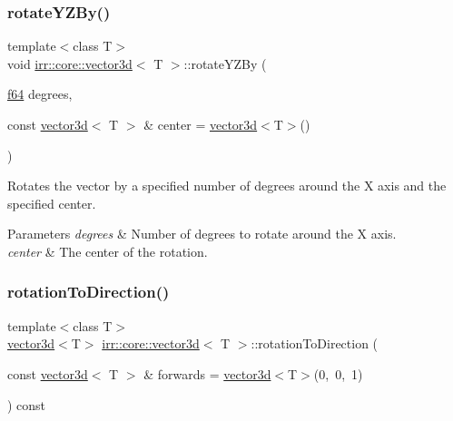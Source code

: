 \subsubsection{\texorpdfstring{rotate\+Y\+Z\+By()}{rotateYZBy()}\hspace{0.1cm}{\footnotesize\ttfamily [2/2]}}
{\footnotesize\ttfamily template$<$class T$>$ \\
void \hyperlink{classirr_1_1core_1_1vector3d}{irr\+::core\+::vector3d}$<$ T $>$\+::rotate\+Y\+Z\+By (\begin{DoxyParamCaption}\item[{\hyperlink{namespaceirr_a1325b02603ad449f92c68fc640af9b28}{f64}}]{degrees,  }\item[{const \hyperlink{classirr_1_1core_1_1vector3d}{vector3d}$<$ T $>$ \&}]{center = {\ttfamily \hyperlink{classirr_1_1core_1_1vector3d}{vector3d}$<$T$>$()} }\end{DoxyParamCaption})\hspace{0.3cm}{\ttfamily [inline]}}



Rotates the vector by a specified number of degrees around the X axis and the specified center. 


\begin{DoxyParams}{Parameters}
{\em degrees} & Number of degrees to rotate around the X axis. \\
\hline
{\em center} & The center of the rotation. \\
\hline
\end{DoxyParams}
\mbox{\label{classirr_1_1core_1_1vector3d_a53d222e7aace72513210bddb2b25376f}} 
\subsubsection{\texorpdfstring{rotation\+To\+Direction()}{rotationToDirection()}\hspace{0.1cm}{\footnotesize\ttfamily [1/2]}}
{\footnotesize\ttfamily template$<$class T$>$ \\
\hyperlink{classirr_1_1core_1_1vector3d}{vector3d}$<$T$>$ \hyperlink{classirr_1_1core_1_1vector3d}{irr\+::core\+::vector3d}$<$ T $>$\+::rotation\+To\+Direction (\begin{DoxyParamCaption}\item[{const \hyperlink{classirr_1_1core_1_1vector3d}{vector3d}$<$ T $>$ \&}]{forwards = {\ttfamily \hyperlink{classirr_1_1core_1_1vector3d}{vector3d}$<$T$>$(0,~0,~1)} }\end{DoxyParamCaption}) const\hspace{0.3cm}{\ttfamily [inline]}}



